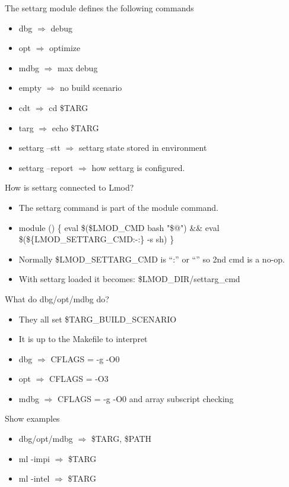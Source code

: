 \documentclass{beamer}
\begin{document}
\begin{frame}{The settarg module defines the following commands}
  \begin{itemize}
    \item dbg $\Rightarrow$ debug
    \item opt $\Rightarrow$ optimize
    \item mdbg $\Rightarrow$ max debug
    \item empty $\Rightarrow$ no build scenario 
    \item cdt   $\Rightarrow$ cd \$TARG
    \item targ   $\Rightarrow$ echo \$TARG
    \item settarg --stt $\Rightarrow$ settarg state stored in
      environment
    \item settarg --report $\Rightarrow$ how settarg is configured.
  \end{itemize}
\end{frame}

\begin{frame}{How is settarg connected to Lmod?}
  \begin{itemize}
    \item The settarg command is part of the module command.
    \item module () \{ eval \$(\$LMOD\_CMD bash "\$@") \&\&
             eval \$(\$\{LMOD\_SETTARG\_CMD:-:\} -s sh) \}
    \item Normally \$LMOD\_SETTARG\_CMD is ``:'' or ``'' so 2nd cmd is a
      no-op.
    \item With settarg loaded it becomes: \$LMOD\_DIR/settarg\_cmd
  \end{itemize}
\end{frame}

\begin{frame}{What do dbg/opt/mdbg do?}
  \begin{itemize}
    \item They all set \$TARG\_BUILD\_SCENARIO
    \item It is up to the Makefile to interpret
    \item dbg $\Rightarrow$ CFLAGS = -g -O0
    \item opt $\Rightarrow$ CFLAGS = -O3
    \item mdbg $\Rightarrow$ CFLAGS = -g -O0 and array subscript checking
  \end{itemize}
\end{frame}

\begin{frame}{Show examples}
  \begin{itemize}
    \item dbg/opt/mdbg $\Rightarrow$ \$TARG, \$PATH
    \item ml -impi $\Rightarrow$ \$TARG
    \item ml -intel $\Rightarrow$ \$TARG
  \end{itemize}
\end{frame}
\end{document}

